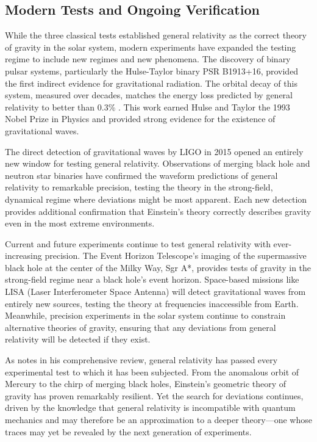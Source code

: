 \documentclass[12pt, a4paper]{article}
\begin{document}
	\subsection{Modern Tests and Ongoing Verification}
	While the three classical tests established general relativity as the correct theory of gravity in the solar system, modern experiments have expanded the testing regime to include new regimes and new phenomena. The discovery of binary pulsar systems, particularly the Hulse-Taylor binary PSR B1913+16, provided the first indirect evidence for gravitational radiation. The orbital decay of this system, measured over decades, matches the energy loss predicted by general relativity to better than 0.3\% \citep{willConfrontationGeneralRelativity2014}. This work earned Hulse and Taylor the 1993 Nobel Prize in Physics and provided strong evidence for the existence of gravitational waves.
	
	The direct detection of gravitational waves by LIGO in 2015 opened an entirely new window for testing general relativity. Observations of merging black hole and neutron star binaries have confirmed the waveform predictions of general relativity to remarkable precision, testing the theory in the strong-field, dynamical regime where deviations might be most apparent. Each new detection provides additional confirmation that Einstein's theory correctly describes gravity even in the most extreme environments.
	
	Current and future experiments continue to test general relativity with ever-increasing precision. The Event Horizon Telescope's imaging of the supermassive black hole at the center of the Milky Way, Sgr A*, provides tests of gravity in the strong-field regime near a black hole's event horizon. Space-based missions like LISA (Laser Interferometer Space Antenna) will detect gravitational waves from entirely new sources, testing the theory at frequencies inaccessible from Earth. Meanwhile, precision experiments in the solar system continue to constrain alternative theories of gravity, ensuring that any deviations from general relativity will be detected if they exist.
	
	As \citep{willConfrontationGeneralRelativity2014} notes in his comprehensive review, general relativity has passed every experimental test to which it has been subjected. From the anomalous orbit of Mercury to the chirp of merging black holes, Einstein's geometric theory of gravity has proven remarkably resilient. Yet the search for deviations continues, driven by the knowledge that general relativity is incompatible with quantum mechanics and may therefore be an approximation to a deeper theory---one whose traces may yet be revealed by the next generation of experiments.
	
\end{document}

